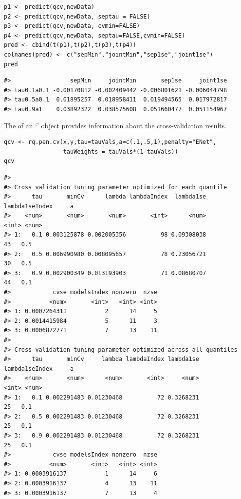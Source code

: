 \begin{verbatim}
p1 <- predict(qcv,newData)
p2 <- predict(qcv,newData, septau = FALSE)
p3 <- predict(qcv,newData, cvmin=FALSE)
p4 <- predict(qcv,newData, septau=FALSE,cvmin=FALSE)
pred <- cbind(t(p1),t(p2),t(p3),t(p4))
colnames(pred) <- c("sepMin","jointMin","sep1se","joint1se")
pred
\end{verbatim}

\begin{verbatim}
#>                 sepMin     jointMin       sep1se     joint1se
#> tau0.1a0.1 -0.00170812 -0.002409442 -0.006801621 -0.006044798
#> tau0.5a0.1  0.01895257  0.018958411  0.019494565  0.017972817
#> tau0.9a1    0.03892322  0.038575608  0.051660477  0.051154967
\end{verbatim}

The  of an `' object provides information about the cross-validation results.

\begin{verbatim}
qcv <- rq.pen.cv(x,y,tau=tauVals,a=c(.1,.5,1),penalty="ENet",
                 tauWeights = tauVals*(1-tauVals))
qcv
\end{verbatim}

\begin{verbatim}
#> 
#> Cross validation tuning parameter optimized for each quantile
#>      tau       minCv      lambda lambdaIndex  lambda1se lambda1seIndex     a
#>    <num>       <num>       <num>       <int>      <num>          <int> <num>
#> 1:   0.1 0.003125878 0.002005356          98 0.09308038             43   0.5
#> 2:   0.5 0.006990980 0.008095657          78 0.23056721             30   0.5
#> 3:   0.9 0.002900349 0.013193903          71 0.08680707             44   0.1
#>            cvse modelsIndex nonzero  nzse
#>           <num>       <int>   <int> <int>
#> 1: 0.0007264311           2      14     5
#> 2: 0.0014415984           5      11     3
#> 3: 0.0006872771           7      13    11
#> 
#> Cross validation tuning parameter optimized across all quantiles
#>      tau       minCv     lambda lambdaIndex lambda1se lambda1seIndex     a
#>    <num>       <num>      <num>       <int>     <num>          <int> <num>
#> 1:   0.1 0.002291483 0.01230468          72 0.3268231             25   0.1
#> 2:   0.5 0.002291483 0.01230468          72 0.3268231             25   0.1
#> 3:   0.9 0.002291483 0.01230468          72 0.3268231             25   0.1
#>            cvse modelsIndex nonzero  nzse
#>           <num>       <int>   <int> <int>
#> 1: 0.0003916137           1      14     6
#> 2: 0.0003916137           4      13    11
#> 3: 0.0003916137           7      13     4
\end{verbatim}


